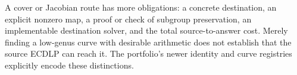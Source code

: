 A cover or Jacobian route has more obligations: a concrete destination,
an explicit nonzero map, a proof or check of subgroup preservation, an
implementable destination solver, and the total source-to-answer cost.
Merely finding a low-genus curve with desirable arithmetic does not
establish that the source ECDLP can reach it. The portfolio's newer
identity and curve registries explicitly encode these distinctions.
